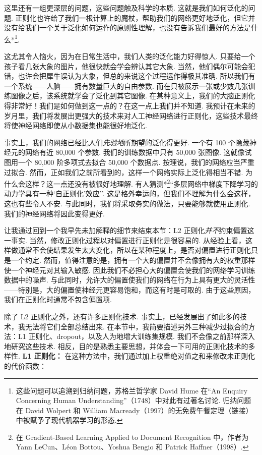 这里还有一组更深层的问题，这些问题触及科学的本质. 这就是我们如何泛化的问题. 正则化也许给了我们一根计算上的魔杖，帮助我们的网络更好地泛化，但它并没有给我们一个关于泛化如何运作的原则性理解，也没有告诉我们最好的方法是什么*\footnote{这些问题可以追溯到归纳问题，苏格兰哲学家 David Hume 在``An Enquiry Concerning Human Understanding''（1748）中对此有过著名讨论. 归纳问题在 David Wolpert 和 William Macready（1997）的无免费午餐定理（链接）中被赋予了现代机器学习的形态.}.

这尤其令人恼火，因为在日常生活中，我们人类的泛化能力好得惊人. 只要给一个孩子看几张大象的图片，他很快就会学会辨认其它大象. 当然，他们偶尔可能会犯错，也许会把犀牛误认为大象，但总的来说这个过程运作得极其准确. 所以我们有一个系统——人脑——拥有数量巨大的自由参数. 而在只被展示一张或少数几张训练图像之后，该系统就学会了泛化到其它图像. 在某种意义上，我们的大脑正则化得非常好！我们是如何做到这一点的？在这一点上我们并不知道. 我预计在未来的岁月里，我们将发展出更强大的技术来对人工神经网络进行正则化，这些技术最终将使神经网络即使从小数据集也能很好地泛化.

事实上，我们的网络已经比人们\emph{先验地}所期望的泛化得更好. 一个有 100 个隐藏神经元的网络有近 80,000 个参数. 我们的训练数据中只有 50,000 张图像. 这就像试图用一个 80,000 阶多项式去拟合 50,000 个数据点. 按理说，我们的网络应当严重过拟合. 然而，正如我们之前所看到的，这样一个网络实际上泛化得相当不错. 为什么会这样？这一点还没有被很好地理解. 有人猜测*\footnote{在 Gradient-Based Learning Applied to Document Recognition 中，作者为 Yann LeCun、Léon Bottou、Yoshua Bengio 和 Patrick Haffner（1998）.}``多层网络中梯度下降学习的动力学具有一种`自正则化'效应''. 这是格外幸运的，但我们不理解为什么会这样，这也有些令人不安. 与此同时，我们将采取务实的做法，只要能够就使用正则化. 我们的神经网络将因此变得更好.

让我通过回到一个我早先未加解释的细节来结束本节：L2 正则化\emph{并不}约束偏置这一事实. 当然，修改正则化过程以对偏置进行正则化是很容易的. 从经验上看，这样做通常不会使结果发生太大变化，所以在某种程度上，是否对偏置进行正则化只是一个约定. 然而，值得注意的是，拥有一个大的偏置并不会像拥有大的权重那样使一个神经元对其输入敏感. 因此我们不必担心大的偏置会使我们的网络学习训练数据中的噪声. 与此同时，允许大的偏置使我们的网络在行为上具有更大的灵活性——特别是，大的偏置使神经元更容易饱和，而这有时是可取的. 由于这些原因，我们在正则化时通常不包含偏置项.

除了 L2 正则化之外，还有许多正则化技术. 事实上，已经发展出了如此多的技术，我无法将它们全部总结出来. 在本节中，我简要描述另外三种减少过拟合的方法：L1 正则化、dropout，以及人为地增大训练集规模. 我们不会像之前那样深入地研究这些技术. 相反，目的是熟悉主要思想，并体会一下可用的正则化技术的多样性. \textbf{L1 正则化：} 在这种方法中，我们通过加上权重绝对值之和来修改未正则化的代价函数：

